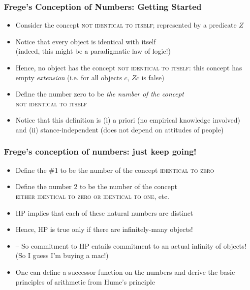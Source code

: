 \begin{frame}
\frametitle{Frege's Conception of Numbers: Getting Started}

\begin{itemize}[<+->]

\item Consider the concept \textsc{not identical to itself}; represented by a predicate $Z$

\item Notice that every object is identical with itself \\ (indeed, this might be a paradigmatic law of logic!)

\item Hence, no object has the concept \textsc{not identical to itself}: this concept has empty \textit{extension} (i.e. for all objects $c$, $Zc$ is false)

\item Define the number zero to be \textit{the number of the concept} \\ \textsc{not identical to itself}

\item Notice that this definition is (i) a priori (no empirical knowledge involved) and (ii) stance-independent (does not depend on attitudes of people)

\end{itemize}
\end{frame}

\begin{frame}
\frametitle{Frege's conception of numbers: just keep going!}

\begin{itemize}[<+->]

\item Define the \#1 to be the number of the concept \textsc{identical to zero}

\item Define the number 2 to be the number of the concept \\ \textsc{either identical to zero or identical to one}, etc.

\item HP implies that each of these natural numbers are distinct 

\item Hence, HP is true only if there are infinitely-many objects! 
\item[] -- So commitment to HP entails commitment to an actual infinity of objects! (So I guess I'm buying a mac!)

\item One can define a successor function on the numbers and derive the basic principles of arithmetic from Hume's principle

\end{itemize}
\end{frame}

